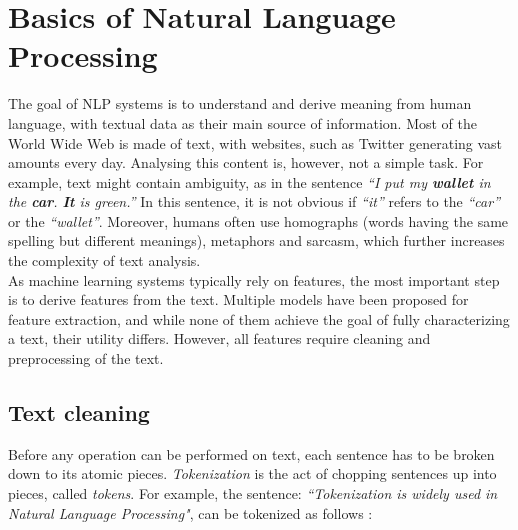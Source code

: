 \section{Basics of Natural Language Processing}\label{sec:NLP}
The goal of NLP systems is to understand and derive meaning from human language, with textual data as their main source of information.
Most of the World Wide Web is made of text, with websites, such as Twitter generating vast amounts every day. Analysing this content is, however, not a simple task. For example, text might contain ambiguity, as in the sentence \emph{``I put my \textbf{wallet} in the  \textbf{car}.  \textbf{It} is green.''} In this sentence, it is not obvious if \emph{``it''} refers to the \emph{``car''} or the  \emph{``wallet''}. Moreover, humans often use homographs (words having the same spelling but different meanings), metaphors and sarcasm, which further increases the complexity of text analysis.\\
As machine learning systems typically rely on features, the most important step is to derive features from the text. Multiple models have been proposed for feature extraction, and while none of them achieve the goal of fully characterizing a text, their utility differs.
%
However, all features require cleaning and preprocessing of the text. 


\subsection{Text cleaning }\label{subsec:cleaning}
Before any operation can be performed on text, each sentence has to be broken down to its atomic pieces. \emph{Tokenization} is the act of chopping sentences up into pieces, called \emph{tokens}.  For example, the sentence: \emph{``Tokenization is widely used in Natural Language Processing"}, can be tokenized as follows : \\

